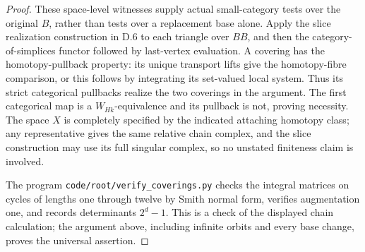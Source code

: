 \begin{proof}
These space-level witnesses supply actual small-category tests over the original $B$, rather than tests over a replacement base alone. Apply the slice realization construction in D.6 to each triangle over $BB$, and then the category-of-simplices functor followed by last-vertex evaluation. A covering has the homotopy-pullback property: its unique transport lifts give the homotopy-fibre comparison, or this follows by integrating its set-valued local system. Thus its strict categorical pullbacks realize the two coverings in the argument. The first categorical map is a $W_{Hk}$-equivalence and its pullback is not, proving necessity. The space $X$ is completely specified by the indicated attaching homotopy class; any representative gives the same relative chain complex, and the slice construction may use its full singular complex, so no unstated finiteness claim is involved.

The program \texttt{code/root/verify\_coverings.py} checks the integral matrices on cycles of lengths one through twelve by Smith normal form, verifies augmentation one, and records determinants $2^d-1$. This is a check of the displayed chain calculation; the argument above, including infinite orbits and every base change, proves the universal assertion.
\end{proof}
